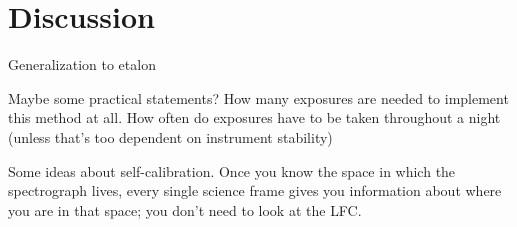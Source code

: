 \documentclass[12pt, letterpaper]{article}
\newcommand{\acronym}[1]{{\small{#1}}}
\newcommand{\lfc}{\acronym{LFC}}
\begin{document}
\section{Discussion} \label{sec:discussion}

Generalization to etalon

Maybe some practical statements?  How many exposures are needed to implement this method at all.  How often do exposures have to be taken throughout a night (unless that's too dependent on instrument stability)

Some ideas about self-calibration. Once you know the space in which the
spectrograph lives, every single science frame gives you information about
where you are in that space; you don't need to look at the \lfc.
\end{document}
